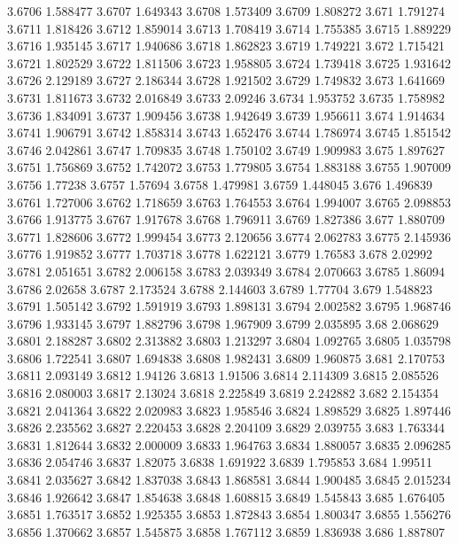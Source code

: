 3.6706  1.588477
3.6707  1.649343
3.6708  1.573409
3.6709  1.808272
3.671  1.791274
3.6711  1.818426
3.6712  1.859014
3.6713  1.708419
3.6714  1.755385
3.6715  1.889229
3.6716  1.935145
3.6717  1.940686
3.6718  1.862823
3.6719  1.749221
3.672  1.715421
3.6721  1.802529
3.6722  1.811506
3.6723  1.958805
3.6724  1.739418
3.6725  1.931642
3.6726  2.129189
3.6727  2.186344
3.6728  1.921502
3.6729  1.749832
3.673  1.641669
3.6731  1.811673
3.6732  2.016849
3.6733  2.09246
3.6734  1.953752
3.6735  1.758982
3.6736  1.834091
3.6737  1.909456
3.6738  1.942649
3.6739  1.956611
3.674  1.914634
3.6741  1.906791
3.6742  1.858314
3.6743  1.652476
3.6744  1.786974
3.6745  1.851542
3.6746  2.042861
3.6747  1.709835
3.6748  1.750102
3.6749  1.909983
3.675  1.897627
3.6751  1.756869
3.6752  1.742072
3.6753  1.779805
3.6754  1.883188
3.6755  1.907009
3.6756  1.77238
3.6757  1.57694
3.6758  1.479981
3.6759  1.448045
3.676  1.496839
3.6761  1.727006
3.6762  1.718659
3.6763  1.764553
3.6764  1.994007
3.6765  2.098853
3.6766  1.913775
3.6767  1.917678
3.6768  1.796911
3.6769  1.827386
3.677  1.880709
3.6771  1.828606
3.6772  1.999454
3.6773  2.120656
3.6774  2.062783
3.6775  2.145936
3.6776  1.919852
3.6777  1.703718
3.6778  1.622121
3.6779  1.76583
3.678  2.02992
3.6781  2.051651
3.6782  2.006158
3.6783  2.039349
3.6784  2.070663
3.6785  1.86094
3.6786  2.02658
3.6787  2.173524
3.6788  2.144603
3.6789  1.77704
3.679  1.548823
3.6791  1.505142
3.6792  1.591919
3.6793  1.898131
3.6794  2.002582
3.6795  1.968746
3.6796  1.933145
3.6797  1.882796
3.6798  1.967909
3.6799  2.035895
3.68  2.068629
3.6801  2.188287
3.6802  2.313882
3.6803  1.213297
3.6804  1.092765
3.6805  1.035798
3.6806  1.722541
3.6807  1.694838
3.6808  1.982431
3.6809  1.960875
3.681  2.170753
3.6811  2.093149
3.6812  1.94126
3.6813  1.91506
3.6814  2.114309
3.6815  2.085526
3.6816  2.080003
3.6817  2.13024
3.6818  2.225849
3.6819  2.242882
3.682  2.154354
3.6821  2.041364
3.6822  2.020983
3.6823  1.958546
3.6824  1.898529
3.6825  1.897446
3.6826  2.235562
3.6827  2.220453
3.6828  2.204109
3.6829  2.039755
3.683  1.763344
3.6831  1.812644
3.6832  2.000009
3.6833  1.964763
3.6834  1.880057
3.6835  2.096285
3.6836  2.054746
3.6837  1.82075
3.6838  1.691922
3.6839  1.795853
3.684  1.99511
3.6841  2.035627
3.6842  1.837038
3.6843  1.868581
3.6844  1.900485
3.6845  2.015234
3.6846  1.926642
3.6847  1.854638
3.6848  1.608815
3.6849  1.545843
3.685  1.676405
3.6851  1.763517
3.6852  1.925355
3.6853  1.872843
3.6854  1.800347
3.6855  1.556276
3.6856  1.370662
3.6857  1.545875
3.6858  1.767112
3.6859  1.836938
3.686  1.887807
